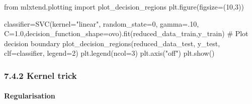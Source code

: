 \documentclass[
  letterpaper,
  DIV=11,
  numbers=noendperiod]{scrartcl}
\let\oldparagraph\paragraph
\renewcommand{\paragraph}[1]{\oldparagraph{#1}\mbox{}}
\newenvironment{Shaded}{\begin{snugshade}}{\end{snugshade}}
\newcommand{\CommentTok}[1]{\textcolor[rgb]{0.37,0.37,0.37}{#1}}
\newcommand{\DecValTok}[1]{\textcolor[rgb]{0.68,0.00,0.00}{#1}}
\newcommand{\FloatTok}[1]{\textcolor[rgb]{0.68,0.00,0.00}{#1}}
\newcommand{\ImportTok}[1]{\textcolor[rgb]{0.00,0.46,0.62}{#1}}
\newcommand{\NormalTok}[1]{\textcolor[rgb]{0.00,0.23,0.31}{#1}}
\newcommand{\OperatorTok}[1]{\textcolor[rgb]{0.37,0.37,0.37}{#1}}
\newcommand{\StringTok}[1]{\textcolor[rgb]{0.13,0.47,0.30}{#1}}
\begin{document}
\begin{Shaded}
\begin{Highlighting}[]
\ImportTok{from}\NormalTok{ mlxtend.plotting }\ImportTok{import}\NormalTok{ plot\_decision\_regions}
\NormalTok{plt.figure(figsize}\OperatorTok{=}\NormalTok{(}\DecValTok{10}\NormalTok{,}\DecValTok{3}\NormalTok{))}

\NormalTok{classifier}\OperatorTok{=}\NormalTok{SVC(kernel}\OperatorTok{=}\StringTok{"linear"}\NormalTok{, random\_state}\OperatorTok{=}\DecValTok{0}\NormalTok{, gamma}\OperatorTok{=}\FloatTok{.10}\NormalTok{, C}\OperatorTok{=}\FloatTok{1.0}\NormalTok{,decision\_function\_shape}\OperatorTok{=}\StringTok{\textquotesingle{}ovo\textquotesingle{}}\NormalTok{).fit(reduced\_data\_train,y\_train)}
\CommentTok{\# Plot decision boundary}
\NormalTok{plot\_decision\_regions(reduced\_data\_test, y\_test, clf}\OperatorTok{=}\NormalTok{classifier, legend}\OperatorTok{=}\DecValTok{2}\NormalTok{)}
\NormalTok{plt.legend(ncol}\OperatorTok{=}\DecValTok{3}\NormalTok{)}
\NormalTok{plt.axis(}\StringTok{"off"}\NormalTok{)}
\NormalTok{plt.show()}
\end{Highlighting}
\end{Shaded}

\subsubsection{7.4.2 Kernel trick}\label{kernel-trick}

\paragraph{Regularisation}\label{regularisation}
\end{document}

